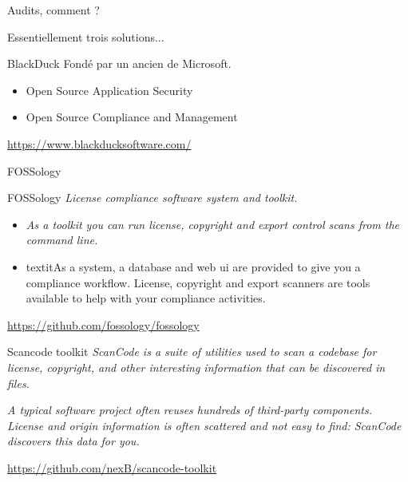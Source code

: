 \documentclass{beamer}
\begin{document}
\begin{frame}{Audits, comment ?}

Essentiellement trois solutions...

\end{frame}


\begin{frame}{BlackDuck}
  Fondé par un ancien de Microsoft.

  \begin{itemize}
  \item Open Source Application Security
  \item Open Source Compliance and Management
  \end{itemize}

\url{https://www.blackducksoftware.com/}
\end{frame}



\begin{frame}{FOSSology}
\begin{block}{FOSSology}
\textit{License compliance software system and toolkit.}
\end{block}
\begin{itemize}
\item \textit{As a toolkit you can run license, copyright and export control scans from the command line.}
\item textit{As a system, a database and web ui are provided to give you a compliance workflow. License, copyright and export scanners are tools available to help with your compliance activities.}
\end{itemize}
\url{https://github.com/fossology/fossology}
\end{frame}


\begin{frame}[plain]%
%  
\end{frame}



\begin{frame}{Scancode toolkit}
\textit{ ScanCode is a suite of utilities used to scan a codebase for license, copyright, and other interesting information that can be discovered in files.}

\textit{A typical software project often reuses hundreds of third-party components. License and origin information is often scattered and not easy to find: ScanCode discovers this data for you.}

\url{https://github.com/nexB/scancode-toolkit}
\end{frame}
\end{document}
